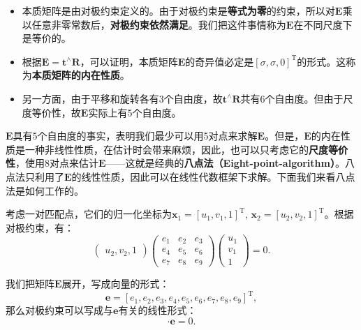 \begin{itemize}
	\item 本质矩阵是由对极约束定义的。由于对极约束是\textbf{等式为零}的约束，所以对$\bm{E}$乘以任意非零常数后，\textbf{对极约束依然满足}。我们把这件事情称为$\bm{E}$在不同尺度下是等价的。
	\item 根据$\bm{E} = \bm{t}^ \wedge \bm{R}$，可以证明\textsuperscript{\cite{Hartley2003}}，本质矩阵$\bm{E}$的奇异值必定是$[\sigma, \sigma, 0]^\mathrm{T}$的形式。这称为\textbf{本质矩阵的内在性质}。
	\item 另一方面，由于平移和旋转各有3个自由度，故$\bm{t}^\wedge \bm{R}$共有6个自由度。但由于尺度等价性，故$\bm{E}$实际上有5个自由度。
\end{itemize}

$\bm{E}$具有5个自由度的事实，表明我们最少可以用5对点来求解$\bm{E}$。但是，$\bm{E}$的内在性质是一种非线性性质，在估计时会带来麻烦，因此，也可以只考虑它的\textbf{尺度等价性}，使用8对点来估计$\bm{E}$——这就是经典的\textbf{八点法（Eight-point-algorithm）}\textsuperscript{\cite{Hartley1997, Longuet-Higgins1987}}。八点法只利用了$\bm{E}$的线性性质，因此可以在线性代数框架下求解。下面我们来看八点法是如何工作的。

考虑一对匹配点，它们的归一化坐标为$\bm{x}_{1}=[u_{1},v_{1},1]^\mathrm{T}$, $\bm{x}_{2}=[u_{2},v_{2},1]^{\mathrm{T}}$。根据对极约束，有：
\begin{equation}
\begin{pmatrix} 
u_{2},v_{2},1
\end{pmatrix}
\begin{pmatrix}
 e_{1} & e_{2} & e_{3}\\ 
 e_{4} & e_{5} & e_{6}\\ 
 e_{7} & e_{8} & e_{9} 
\end{pmatrix}
\begin{pmatrix} 
u_{1}\\v_{1}\\1
\end{pmatrix}
=0.
\end{equation}

我们把矩阵$\bm{E}$展开，写成向量的形式：
\[
\bm{e}= [e_{1},e_{2},e_{3},e_{4},e_{5},e_{6},e_{7},e_{8},e_{9}]^{\mathrm{T}},
\]
那么对极约束可以写成与$\bm{e}$有关的线性形式：
\begin{equation}
[u_{2}u_{1},u_{2}v_{1},u_{2},v_{2}u_{1},v_{2}v_{1},v_{2},u_{1},v_{1},1] \cdot  \bm{e}=0.
\end{equation}

